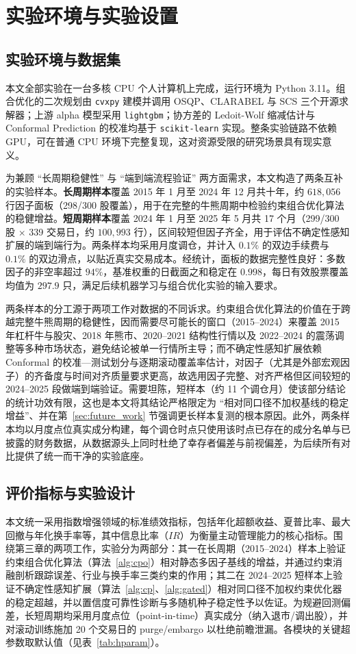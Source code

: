 \section{实验环境与实验设置}
\label{sec:exp_setup}

\subsection{实验环境与数据集}
本文全部实验在一台多核 CPU 个人计算机上完成，运行环境为 Python 3.11。组合优化的二次规划由 \texttt{cvxpy} 建模并调用 OSQP、CLARABEL 与 SCS 三个开源求解器；上游 alpha 模型采用 \texttt{lightgbm}；协方差的 Ledoit-Wolf 缩减估计与 Conformal Prediction 的校准均基于 \texttt{scikit-learn} 实现。整条实验链路不依赖 GPU，可在普通 CPU 环境下完整复现，这对资源受限的研究场景具有现实意义。

为兼顾 ``长周期稳健性'' 与 ``端到端流程验证'' 两方面需求，本文构造了两条互补的实验样本。\textbf{长周期样本}覆盖 2015 年 1 月至 2024 年 12 月共十年，约 $618{,}056$ 行因子面板（298/300 股覆盖），用于在完整的牛熊周期中检验约束组合优化算法的稳健增益。\textbf{短周期样本}覆盖 2024 年 1 月至 2025 年 5 月共 17 个月（299/300 股 $\times$ 339 交易日，约 $100{,}993$ 行），区间较短但因子齐全，用于评估不确定性感知扩展的端到端行为。两条样本均采用月度调仓，并计入 $0.1\%$ 的双边手续费与 $0.1\%$ 的双边滑点，以贴近真实交易成本。经统计，面板的数据完整性良好：多数因子的非空率超过 $94\%$，基准权重的日截面之和稳定在 $0.998$，每日有效股票覆盖均值为 $297.9$ 只，满足后续机器学习与组合优化实验的输入要求。

两条样本的分工源于两项工作对数据的不同诉求。约束组合优化算法的价值在于跨越完整牛熊周期的稳健性，因而需要尽可能长的窗口（2015--2024）来覆盖 2015 年杠杆牛与股灾、2018 年熊市、2020--2021 结构性行情以及 2022--2024 的震荡调整等多种市场状态，避免结论被单一行情所主导；而不确定性感知扩展依赖 Conformal 的校准—测试划分与逐期滚动覆盖率估计，对因子（尤其是外部宏观因子）的齐备度与时间对齐质量要求更高，故选用因子完整、对齐严格但区间较短的 2024--2025 段做端到端验证。需要坦陈，短样本（约 11 个调仓月）使该部分结论的统计功效有限，这也是本文将其结论严格限定为 ``相对同口径不加权基线的稳定增益''、并在第~\ref{sec:future_work} 节强调更长样本复测的根本原因。此外，两条样本均以月度点位真实成分构建，每个调仓时点只使用该时点已存在的成分名单与已披露的财务数据，从数据源头上同时杜绝了幸存者偏差与前视偏差，为后续所有对比提供了统一而干净的实验底座。

\subsection{评价指标与实验设计}
本文统一采用指数增强领域的标准绩效指标，包括年化超额收益、夏普比率、最大回撤与年化换手率等，其中信息比率（$IR$）为衡量主动管理能力的核心指标。围绕第三章的两项工作，实验分为两部分：其一在长周期（2015--2024）样本上验证约束组合优化算法（算法~\ref{alg:cpo}）相对静态多因子基线的增益，并通过约束消融剖析跟踪误差、行业与换手率三类约束的作用；其二在 2024--2025 短样本上验证不确定性感知扩展（算法~\ref{alg:cp}、\ref{alg:gated}）相对同口径不加权约束优化器的稳定超越，并以置信度可靠性诊断与多随机种子稳定性予以佐证。为规避回测偏差，长短周期均采用月度点位（point-in-time）真实成分（纳入退市/调出股），并对滚动训练施加 20 个交易日的 purge/embargo 以杜绝前瞻泄漏。各模块的关键超参数取默认值（见表~\ref{tab:hparam}）。

